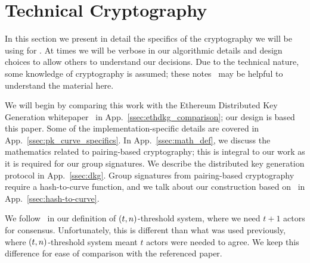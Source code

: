 \section{Technical Cryptography}
\label{sec:tech_crypto}

In this section we present in detail the specifics of the
cryptography we will be using for \LayerTwo{}.
At times we will be verbose in our algorithmic details
and design choices to allow others to understand our decisions.
Due to the technical nature, some knowledge of cryptography is assumed;
these notes~\cite{notes-math-crypto} may be helpful
to understand the material here.

We will begin by comparing this work with the
Ethereum Distributed Key Generation whitepaper~\cite{ethdkg}
in App.~\ref{ssec:ethdkg_comparison};
our design is based this paper.
Some of the implementation-specific details are covered in
App.~\ref{ssec:pk_curve_specifics}.
In App.~\ref{ssec:math_def}, we discuss the mathematics
related to pairing-based cryptography; this is integral to
our work as it is required for our group signatures.
We describe the distributed key generation protocol in
App.~\ref{ssec:dkg}.
Group signatures from pairing-based cryptography require
a hash-to-curve function, and we talk about our construction
based on~\cite{ft2012bnhashtocurve,boneh2019h2cBLS12}
in App.~\ref{ssec:hash-to-curve}.

We follow~\cite{ethdkg} in our definition of
$\left( t,n \right)$-threshold system, where we need $t+1$ actors
for consensus.
Unfortunately, this is different than what was used previously,
where $\left( t,n \right)$-threshold system meant $t$ actors were
needed to agree.
We keep this difference for ease of comparison with the referenced paper.






